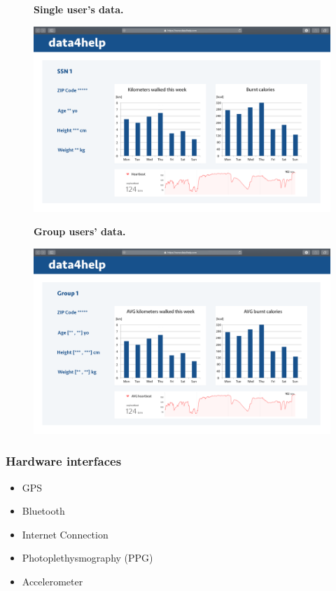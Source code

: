 \documentclass{article}
\begin{document}
\begin{figure}[h!]
\centering
    \textbf{Single user's data.}\par\medskip
	\includegraphics[width= \linewidth]{6userprofile.png}
\end{figure}\newpage
\begin{figure}[h!]
\centering
    \textbf{Group users' data.}\par\medskip
	\includegraphics[width= \linewidth]{7groupprofile.png}
\end{figure}\newpage
\subsubsection{Hardware interfaces}
\begin{itemize}
	\item GPS
	\item Bluetooth
	\item Internet Connection
	\item Photoplethysmography (PPG)
	\item Accelerometer
\end{itemize}
\end{document}
